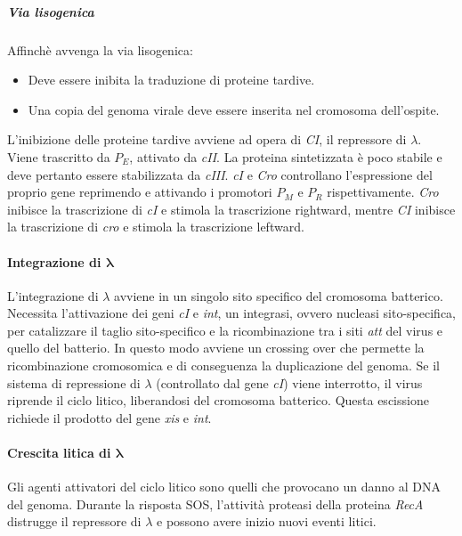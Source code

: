 				\subparagraph{Via lisogenica}
				Affinch\`e avvenga la via lisogenica:
				\begin{multicols}{2}
					\begin{itemize}
						\item Deve essere inibita la traduzione di proteine tardive.
						\item Una copia del genoma virale deve essere inserita nel cromosoma dell'ospite.
					\end{itemize}
				\end{multicols}
				L'inibizione delle proteine tardive avviene ad opera di \emph{CI}, il repressore di $\lambda$.
				Viene trascritto da \emph{$P_E$}, attivato da \emph{cII}.
				La proteina sintetizzata \`e poco stabile e deve pertanto essere stabilizzata da \emph{cIII}.
				\emph{cI} e \emph{Cro} controllano l'espressione del proprio gene reprimendo e attivando i promotori \emph{$P_M$} e \emph{$P_R$} rispettivamente.
				\emph{Cro} inibisce la trascrizione di \emph{cI} e stimola la trascrizione rightward, mentre \emph{CI} inibisce la trascrizione di \emph{cro} e stimola la trascrizione leftward.
				
			\paragraph{Integrazione di $\mathbf{\lambda}$}
			L'integrazione di $\lambda$ avviene in un singolo sito specifico del cromosoma batterico. 
			Necessita l'attivazione dei geni \emph{cI} e \emph{int}, un integrasi, ovvero nucleasi sito-specifica, per catalizzare il taglio sito-specifico e la ricombinazione tra i siti \emph{att} del virus e quello del batterio. 
			In questo modo avviene un crossing over che permette la ricombinazione cromosomica e di conseguenza la duplicazione del genoma. 
			Se il sistema di repressione di $\lambda$ (controllato dal gene \emph{cI}) viene interrotto, il virus riprende il ciclo litico, liberandosi del cromosoma batterico. 
			Questa escissione richiede il prodotto del gene \emph{xis} e \emph{int}.

			\paragraph{Crescita litica di $\mathbf{\lambda}$}
			Gli agenti attivatori del ciclo litico sono quelli che provocano un danno al DNA del genoma.
			Durante la risposta SOS, l'attività proteasi della proteina \emph{RecA} distrugge il repressore di $\lambda$ e possono avere inizio nuovi eventi litici. 


